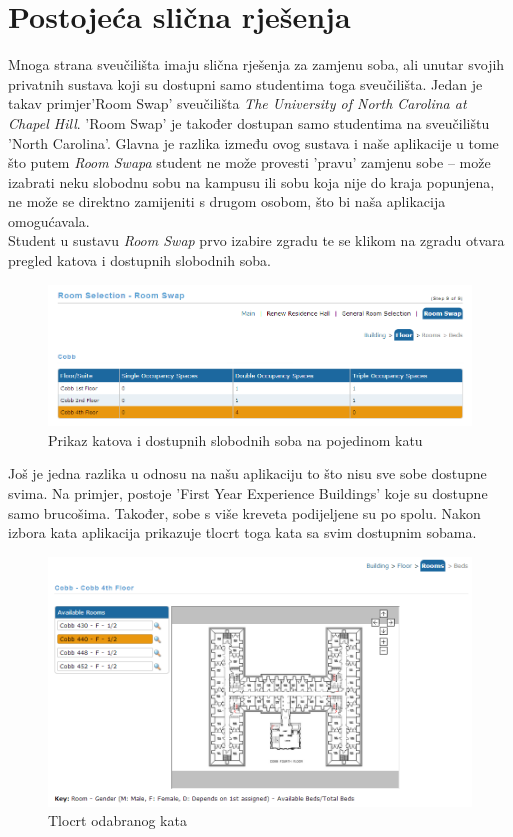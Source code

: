 		\clearpage
		
		
		\section{Postojeća slična rješenja}
		
		Mnoga strana sveučilišta imaju slična rješenja za zamjenu soba, ali unutar svojih privatnih sustava koji su dostupni samo studentima toga sveučilišta. Jedan je takav primjer'Room Swap' sveučilišta \textit{The University of North Carolina at Chapel Hill}. 'Room Swap' je također dostupan samo studentima na sveučilištu 'North Carolina'. 
		Glavna je razlika između ovog sustava i naše aplikacije u tome što putem \textit{Room Swapa} student ne može provesti 'pravu' zamjenu sobe – može izabrati neku slobodnu sobu na kampusu ili sobu koja nije do kraja popunjena, ne može se direktno zamijeniti s drugom osobom, što bi naša aplikacija omogućavala.\\ 
		Student u sustavu \textit{Room Swap} prvo izabire zgradu te se klikom na zgradu otvara pregled katova i dostupnih slobodnih soba.
		
		\begin{figure}[H]
			\includegraphics[width=.7\linewidth]{slike/rs8.png} %
			\centering
			\caption{Prikaz katova i dostupnih slobodnih soba na pojedinom katu}
			\label{fig:promjene} %
		\end{figure}
	
		Još je jedna razlika u odnosu na našu aplikaciju to što nisu sve sobe dostupne svima. Na primjer, postoje 'First Year Experience Buildings' koje su dostupne samo brucošima. Također, sobe s više kreveta podijeljene su po spolu. 
		Nakon izbora kata aplikacija prikazuje tlocrt toga kata sa svim dostupnim sobama. 
		
		\begin{figure}[H]
			\includegraphics[scale=0.4]{slike/rs9.png} %
			\centering
			\caption{Tlocrt odabranog kata}
			\label{fig:promjene2}
		\end{figure}
	
